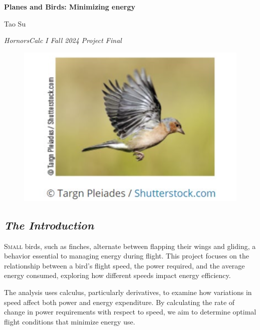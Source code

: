 \documentclass{article}
\begin{document}
\begin{titlepage}
    \centering
    \vspace*{1cm}
    
    \Huge
    \textbf{Planes and Birds: Minimizing energy}
    
    \vspace{0.5cm}
    
    \Large
    Tao Su
    
    \vspace{1.5cm}
    
    \large 
    \textit{HornorsCalc I Fall 2024 Project Final}
    
    \vfill

    \begin{figure}[h]
        \centering
        \includegraphics[width=1\textwidth]{coverPage.png}
    \end{figure}
\end{titlepage}

\newpage

\subsection*{\itshape \large The Introduction}


\lettrine[lines=2]{S}{mall} birds, such as finches, alternate between flapping their wings and gliding, a behavior essential to managing energy during flight. This project focuses on the relationship between a bird’s flight speed, the power required, and the average energy consumed, exploring how different speeds impact energy efficiency.

The analysis uses calculus, particularly derivatives, to examine how variations in speed affect both power and energy expenditure. By calculating the rate of change in power requirements with respect to speed, we aim to determine optimal flight conditions that minimize energy use.
\end{document}
